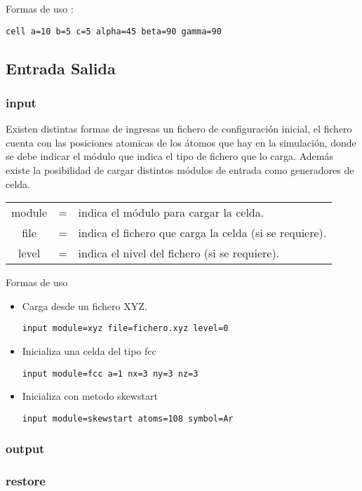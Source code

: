 \documentclass[a4paper,10pt]{scrbook}
\newcommand{\control}[1]{\begin{center}\begin{minipage}{10cm}\texttt{#1}\end{minipage}\end{center}}
\begin{document}
Formas de uso :

\control{cell a=10 b=5 c=5 alpha=45 beta=90 gamma=90}

\subsection{Entrada Salida}

\subsubsection{input}
Existen distintas formas de ingresas un fichero de configuraci\'on inicial, el fichero cuenta con las posiciones atomicas de los \'atomos que hay en la simulaci\'on, donde se debe indicar el m\'odulo que indica el tipo de fichero que lo carga. Adem\'as existe la posibilidad de cargar distintos m\'odulos de entrada como generadores de celda.

\begin{tabular}{ccl}
 module & = & indica el m\'odulo para cargar la celda.\\
 file & = & indica el fichero que carga la celda (si se requiere).\\
 level & = & indica el nivel del fichero (si se requiere).\\
\end{tabular}

Formas de uso

\begin{itemize}
 \item Carga desde un fichero XYZ.

\control{input module=xyz file=fichero.xyz level=0}

 \item Inicializa una celda del tipo fcc

\control{input module=fcc a=1 nx=3 ny=3 nz=3}

 \item Inicializa con metodo skewstart

\control{input module=skewstart atoms=108 symbol=Ar}

\end{itemize}

\subsubsection{output}
\subsubsection{restore}
\end{document}
